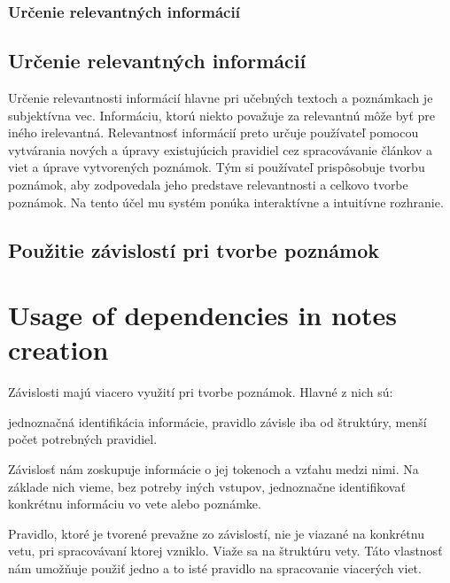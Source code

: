 %
%
{
	\subsubsection{Určenie relevantných informácií}
}
{
	\subsection{Určenie relevantných informácií}
}
\label{subsubsection:determination_of_relevant_information}
Určenie relevantnosti informácií hlavne pri učebných textoch a poznámkach je subjektívna vec. Informáciu, ktorú niekto považuje za relevantnú môže byť pre iného irelevantná. Relevantnosť informácií preto určuje používateľ pomocou vytvárania nových a úpravy existujúcich pravidiel cez spracovávanie článkov a viet a úprave vytvorených poznámok. Tým si používateľ prispôsobuje tvorbu poznámok, aby zodpovedala jeho predstave relevantnosti a celkovo tvorbe poznámok. Na tento účel mu systém ponúka interaktívne a intuitívne rozhranie.

%
%
{
	\subsection{Použitie závislostí pri tvorbe poznámok}
}
{
	\section{Usage of dependencies in notes creation}
}
\label{subsection:use_of_dependencies_in_notes_creation}
Závislosti majú viacero využití pri tvorbe poznámok. Hlavné z nich sú:

\begin{my_itemize}
	\myitem jednoznačná identifikácia informácie,
	\myitem pravidlo závisle iba od štruktúry,
	\myitem menší počet potrebných pravidiel.
\end{my_itemize}

Závislosť nám zoskupuje informácie o jej tokenoch a vzťahu medzi nimi. Na základe nich vieme, bez potreby iných vstupov, jednoznačne identifikovať konkrétnu informáciu vo vete alebo poznámke.

Pravidlo, ktoré je tvorené prevažne zo závislostí, nie je viazané na konkrétnu vetu, pri spracovávaní ktorej vzniklo. Viaže sa na štruktúru vety. Táto vlastnosť nám umožňuje použiť jedno a to isté pravidlo na spracovanie viacerých viet.

